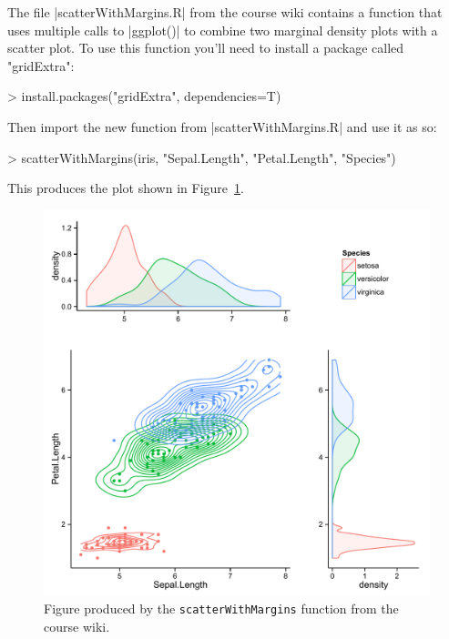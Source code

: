 The file |scatterWithMargins.R| from the course wiki contains a function that uses multiple calls to |ggplot()| to combine two marginal density plots with a scatter plot.  To use this function you'll need to install a package called "gridExtra":
%
\begin{R}
> install.packages("gridExtra", dependencies=T)
\end{R}
Then import the new function from |scatterWithMargins.R| and use it as so:
%
\begin{R}
> scatterWithMargins(iris, "Sepal.Length", "Petal.Length", "Species")
\end{R}
This produces the plot shown in Figure~\ref{fig:ggplotfancy}.
%
\begin{figure}[htbp]
\centering
\includegraphics[width=0.5\columnwidth]{./figures/hands-on2/ggplot-fancy.pdf}
\caption{Figure produced by the \lstinline!scatterWithMargins! function from the course wiki.}
\label{fig:ggplotfancy}
\end{figure}

\newpage